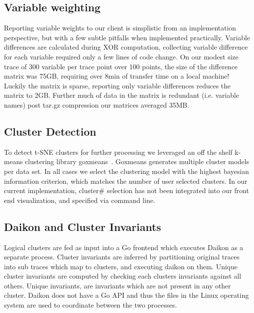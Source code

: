 \subsection{Variable weighting}
Reporting variable weights to our client is simplistic from an
implementation perspective, but with a few subtle pitfalls when
implemented practically. Variable differences are calculated during XOR
computation, collecting variable difference for each variable required
only a few lines of code change. On our modest size trace of 300
variable per trace point over 100 points, the size of the difference
matrix was 75GB, requiring over 8min of transfer time on a local
machine! Luckily the matrix is sparse, reporting only variable
differences reduces the matrix to 2GB. Further much of data in the
matrix is redundant (i.e. variable names) post tar.gz compression our
matrices averaged 35MB.

\subsection{Cluster Detection}
To detect t-SNE clusters for further processing we leveraged an off
the shelf k-means clustering library goxmeans~\cite{goxmeans}. Goxmeans
generates multiple cluster models per data set. In all cases we select
the clustering model with the highest bayesian information criterion,
which matches the number of user selected clusters. In our current
implementation, cluster\# selection has not been integrated into our
front end visualization, and specified via command line.

\subsection{Daikon and Cluster Invariants}
Logical clusters are fed as input into a Go frontend which executes
Daikon as a separate process. Cluster invariants are inferred by
partitioning original traces into sub traces which map to clusters, and
executing daikon on them. Unique cluster invariants are computed by
checking each clusters invariants against all others. Unique
invariants, are invariants which are not present in any other cluster.
Daikon does not have a Go API and thus the files in the Linux
operating system are used to coordinate between the two processes.


